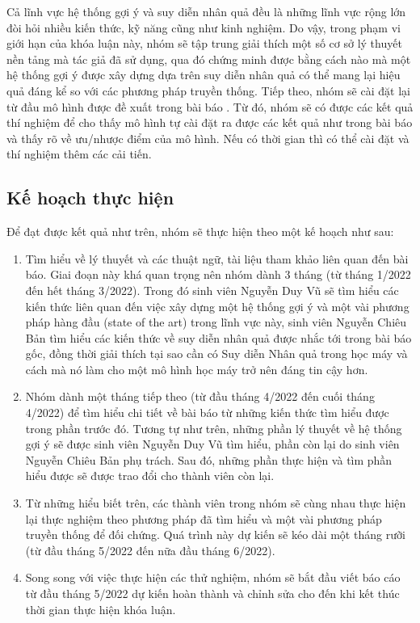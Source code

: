 \documentclass{article}[14pt]
\begin{document}
{    Cả lĩnh vực hệ thống gợi ý và suy diễn nhân quả đều là những lĩnh vực rộng lớn đòi hỏi nhiều kiến thức, kỹ năng cũng như kinh nghiệm. Do vậy, trong phạm vi giới hạn của khóa luận này, nhóm sẽ tập trung giải thích một số cơ sở lý thuyết nền tảng mà tác giả đã sử dụng, qua đó chứng minh được bằng cách nào mà một hệ thống gợi ý được xây dựng dựa trên suy diễn nhân quả có thể mang lại hiệu quả đáng kể so với các phương pháp truyền thống. Tiếp theo, nhóm sẽ cài đặt lại từ đầu mô hình được đề xuất trong bài báo \cite{cause}. Từ đó, nhóm sẽ có được các kết quả thí nghiệm để cho thấy mô hình tự cài đặt ra được các kết quả như trong bài báo và thấy rõ về ưu/nhược điểm của mô hình. Nếu có thời gian thì có thể cài đặt và thí nghiệm thêm các cải tiến.
   
    
    \subsection{Kế hoạch thực hiện}
        
    Để đạt được kết quả như trên, nhóm sẽ thực hiện theo một kế hoạch như sau:
    \begin{enumerate}
        
            \item Tìm hiểu về lý thuyết và các thuật ngữ, tài liệu tham khảo liên quan đến bài báo. Giai đoạn này khá quan trọng nên nhóm dành 3 tháng (từ tháng 1/2022 đến hết tháng 3/2022). Trong đó sinh viên Nguyễn Duy Vũ sẽ tìm hiểu các kiến thức liên quan đến việc xây dựng một hệ thống gợi ý  và một vài phương pháp hàng đầu (state of the art) trong lĩnh vực này, sinh viên Nguyễn Chiêu Bản tìm hiểu các kiến thức về suy diễn nhân quả được nhắc tới trong bài báo gốc, đồng thời giải thích tại sao cần có Suy diễn Nhân quả trong học máy và cách mà nó làm cho một mô hình học máy trở nên đáng tin cậy hơn.
            \item Nhóm dành một tháng tiếp theo (từ đầu tháng 4/2022 đến cuối tháng 4/2022) để tìm hiểu chi tiết về bài báo từ những kiến thức tìm hiểu được trong phần trước đó. Tương tự như trên, những phần lý thuyết về hệ thống gợi ý sẽ được sinh viên Nguyễn Duy Vũ tìm hiểu, phần còn lại do sinh viên Nguyễn Chiêu Bản phụ trách. Sau đó, những phần thực hiện và tìm phần hiểu được sẽ được trao đổi  cho thành viên còn lại. 
            \item Từ những hiểu biết trên, các thành viên trong nhóm sẽ cùng nhau thực hiện lại thực nghiệm theo phương pháp đã tìm hiểu và một vài phương pháp truyền thống để đối chứng. Quá trình này dự kiến sẽ kéo dài một tháng rưỡi (từ đầu tháng 5/2022 đến nữa đầu tháng 6/2022).
            \item Song song với việc thực hiện các thử nghiệm, nhóm sẽ bắt đầu viết báo cáo từ đầu tháng 5/2022 dự kiến hoàn thành và chỉnh sửa cho đến khi kết thúc thời gian thực hiện khóa luận.
        \end{enumerate}
    
    
 
    
    
    }
    
    
    \nocite{*}
\end{document}
